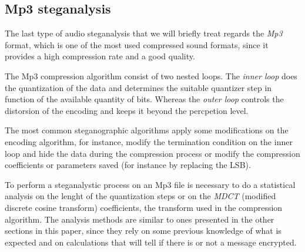 \documentclass[../../main.tex]{subfiles}
\begin{document}
\subsection{Mp3 steganalysis}
The last type of audio steganalysis that we will briefly treat regards the
\emph{Mp3} format, which is one of the most used compressed sound formats,
since it provides a high compression rate and a good quality.

The Mp3 compression algorithm consist of two nested loops.
The \emph{inner loop} does the quantization of the data and determines the
suitable quantizer step in function of the available quantity of bits.
Whereas the \emph{outer loop} controls the distorsion of the encoding and
keeps it beyond the percpetion level.

The most common steganographic algorithms apply some modifications on the
encoding algorithm, for instance, modify the termination condition on the
inner loop and hide the data during the compression process or modify the
compression coefficients or parameters saved (for instance by replacing the
LSB).

To perform a steganalystic process on an Mp3 file is necessary to do a
statistical analysis on the lenght of the quantization steps or on the
\emph{MDCT} (modified discrete cosine transform) coefficients, the transform
used in the compression algorithm.
The analysis methods are similar to ones presented in the other sections in
this paper, since they rely on some previous knowledge of what is expected
and on calculations that will tell if there is or not a message encrypted.
\end{document}
